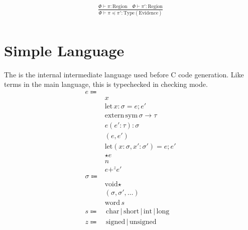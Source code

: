 \documentclass {article}
\begin{document}
\begin{gather*}
\frac
{\Phi \vdash \pi : \text{Region} \quad \Phi \vdash \pi' : \text{Region}}
{\Phi \vdash \pi \preceq \pi' : \text{Type}(\text{Evidence})} \\
\end{gather*}

\section{Simple Language}
The is the internal intermediate language used before C code generation.
Like terms in the main language, this is typechecked in checking mode.
\begin{align*}
e \Coloneqq & \\
& x \\
& \text{let} \, x : \sigma = e; e' \\
& \text{extern} \, \text{sym} \, \sigma \to \tau \\
& e(e' : \tau) : \sigma \\
& (e,e') \\
& \text{let} (x: \sigma, x' : \sigma') = e; e' \\
& \star e \\
& n \\
& e +^z e' \\
\sigma \Coloneqq & \\
& \text{void}\star \\ 
& (\sigma, \sigma', \dots) \\
& \text{word} \, s \\
s \Coloneqq & \, \text{char} \, | \, \text{short} \, | \, \text{int} \, | \, \text{long} \\
z \Coloneqq & \, \text{signed} \, | \, \text{unsigned}
\end{align*}
\end{document}
